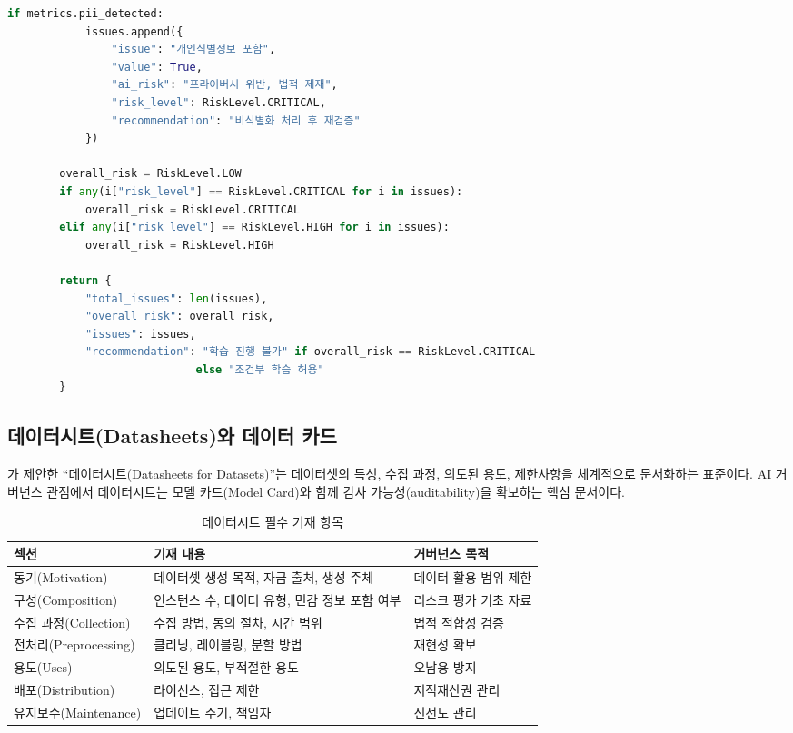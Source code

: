 \begin{lstlisting}[language=Python, caption={데이터 품질-AI 품질 전이 분석기}, label={lst:quality_transfer}]
        if metrics.pii_detected:
            issues.append({
                "issue": "개인식별정보 포함",
                "value": True,
                "ai_risk": "프라이버시 위반, 법적 제재",
                "risk_level": RiskLevel.CRITICAL,
                "recommendation": "비식별화 처리 후 재검증"
            })

        overall_risk = RiskLevel.LOW
        if any(i["risk_level"] == RiskLevel.CRITICAL for i in issues):
            overall_risk = RiskLevel.CRITICAL
        elif any(i["risk_level"] == RiskLevel.HIGH for i in issues):
            overall_risk = RiskLevel.HIGH

        return {
            "total_issues": len(issues),
            "overall_risk": overall_risk,
            "issues": issues,
            "recommendation": "학습 진행 불가" if overall_risk == RiskLevel.CRITICAL
                             else "조건부 학습 허용"
        }
\end{lstlisting}


\subsection{데이터시트(Datasheets)와 데이터 카드}
\label{sec:9.1.3}

\cite{gebru2021datasheets}가 제안한 ``데이터시트(Datasheets for Datasets)''는 데이터셋의 특성, 수집 과정, 의도된 용도, 제한사항을 체계적으로 문서화하는 표준이다. AI 거버넌스 관점에서 데이터시트는 모델 카드(Model Card)와 함께 감사 가능성(auditability)을 확보하는 핵심 문서이다.

\begin{table}[htbp]
\centering
\caption{데이터시트 필수 기재 항목}
\label{tab:datasheet_template}
\begin{tabularx}{\textwidth}{p{3cm}Xp{3cm}}
\toprule
\textbf{섹션} & \textbf{기재 내용} & \textbf{거버넌스 목적} \\
\midrule
동기(Motivation) & 데이터셋 생성 목적, 자금 출처, 생성 주체 & 데이터 활용 범위 제한 \\
\midrule
구성(Composition) & 인스턴스 수, 데이터 유형, 민감 정보 포함 여부 & 리스크 평가 기초 자료 \\
\midrule
수집 과정(Collection) & 수집 방법, 동의 절차, 시간 범위 & 법적 적합성 검증 \\
\midrule
전처리(Preprocessing) & 클리닝, 레이블링, 분할 방법 & 재현성 확보 \\
\midrule
용도(Uses) & 의도된 용도, 부적절한 용도 & 오남용 방지 \\
\midrule
배포(Distribution) & 라이선스, 접근 제한 & 지적재산권 관리 \\
\midrule
유지보수(Maintenance) & 업데이트 주기, 책임자 & 신선도 관리 \\
\bottomrule
\end{tabularx}
\end{table}

